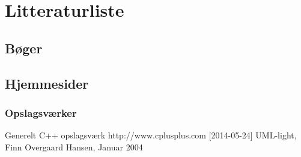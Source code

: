 \chapter{Litteraturliste}

\section{Bøger}




\section{Hjemmesider}


\subsection{Opslagsværker}
Generelt C++ opslagsværk \newline
http://www.cplusplus.com [2014-05-24] \newline
UML-light, Finn Overgaard Hansen, Januar 2004 \newline
